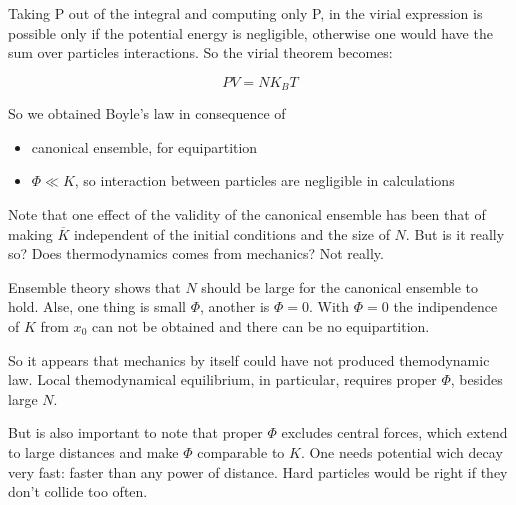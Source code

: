 \documentclass{article}
\begin{document}
Taking P out of the integral and computing only P, in the virial expression is possible only if the potential energy is negligible, otherwise one would have the sum over particles interactions. So the virial theorem becomes:

\begin{equation}
PV = NK_BT
\end{equation}

So we obtained Boyle's law in consequence of

\begin{itemize}
\item canonical ensemble, for equipartition 
\item $\Phi \ll K$, so interaction between particles are negligible in calculations
\end{itemize}

Note that one effect of the validity of the canonical ensemble has been that of making $ \overline{K}$ independent of the initial conditions and the size of $N$. But is it really so? Does thermodynamics comes from mechanics? Not really.

Ensemble theory shows that $N$ should be large for the canonical ensemble to hold. Alse, one thing is small $\Phi$, another is $\Phi=0$. With $\Phi=0$ the indipendence of $K$ from $x_0$ can not be obtained and there can be no equipartition.

So it appears that mechanics by itself could have not produced themodynamic law. Local themodynamical equilibrium, in particular, requires proper $\Phi$, besides large $N$.

But is also important to note that proper $\Phi$ excludes central forces, which extend to large distances and make  $\Phi$ comparable to $K$. One needs potential wich decay very fast: faster than any power of distance. Hard particles would be right if they don't collide too often.
\end{document}
